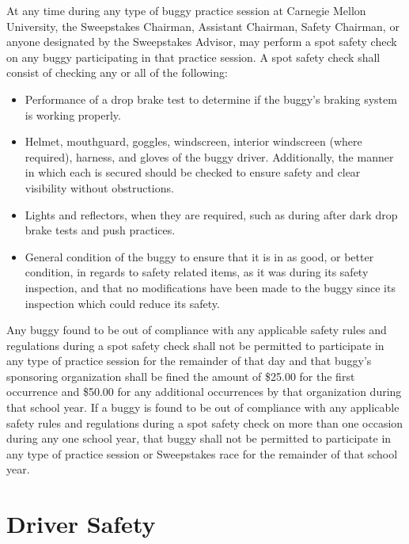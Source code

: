	At any time during any type of buggy practice session at Carnegie Mellon University, the Sweepstakes Chairman, Assistant Chairman, Safety Chairman, or anyone designated by the Sweepstakes Advisor, may perform a spot safety check on any buggy participating in that practice session. A spot safety check shall consist of checking any or all of the following:

	\begin{itemize}

		\item Performance of a drop brake test to determine if the buggy's braking system is working properly.

		\item Helmet, mouthguard, goggles, windscreen, interior windscreen (where required), harness, and gloves of the buggy driver. Additionally, the manner in which each is secured should be checked to ensure safety and clear visibility without obstructions.

		\item Lights and reflectors, when they are required, such as during after dark drop brake tests and push practices.

		\item General condition of the buggy to ensure that it is in as good, or better condition, in regards to safety related items, as it was during its safety inspection, and that no modifications have been made to the buggy since its inspection which could reduce its safety.

	\end{itemize}

	Any buggy found to be out of compliance with any applicable safety rules and regulations during a spot safety check shall not be permitted to participate in any type of practice session for the remainder of that day and that buggy's sponsoring organization shall be fined the amount of \$25.00 for the first occurrence and \$50.00 for any additional occurrences by that organization during that school year. If a buggy is found to be out of compliance with any applicable safety rules and regulations during a spot safety check on more than one occasion during any one school year, that buggy shall not be permitted to participate in any type of practice session or Sweepstakes race for the remainder of that school year.

\section{Driver Safety}

